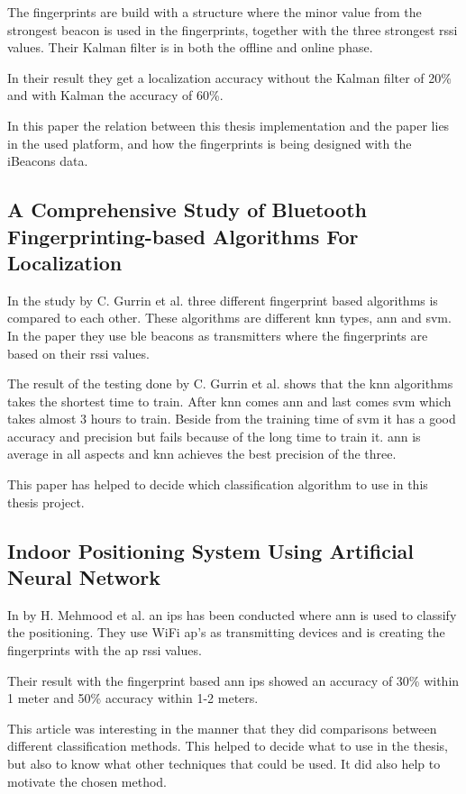 \bigskip

The fingerprints are build with a structure where the minor value from the strongest beacon is used in the fingerprints, together with the three strongest \acrshort{rssi} values.
Their Kalman filter is in both the offline and online phase.

\bigskip

In their result they get a localization accuracy without the Kalman filter of 20\% and with Kalman the accuracy of 60\%.

\bigskip

In this paper the relation between this thesis implementation and the paper lies in the used platform, and how the fingerprints is being designed with the iBeacons data.


\subsection{A Comprehensive Study of Bluetooth Fingerprinting-based Algorithms For 
Localization}\label{sec:}
In the study \cite{ComprehensiveStudyBluetooth2013} by C. Gurrin et al. three different fingerprint based algorithms is compared to each other.
These algorithms are different \acrshort{knn} types, \acrfull{ann} and \acrfull{svm}.
In the paper they use \acrshort{ble} beacons as transmitters where the fingerprints are based on their \acrshort{rssi} values.

\bigskip

The result of the testing done by C. Gurrin et al. shows that the \acrshort{knn} algorithms takes the shortest time to train.
After \acrshort{knn} comes \acrshort{ann} and last comes \acrshort{svm}  which takes almost 3 hours to train.
Beside from the training time of \acrshort{svm}  it has a good accuracy and precision but fails because of the long time to train it.  \acrshort{ann} is average in all aspects and \acrshort{knn} achieves the best precision of the three.

\bigskip

This paper has helped to decide which classification algorithm to use in this thesis project.

\subsection{Indoor Positioning System Using Artificial Neural Network}\label{sec:}
In \cite{IndoorPositioningSystem2010} by H. Mehmood et al. an \acrshort{ips} has been conducted where \acrlong{ann} is used to classify the positioning.
They use WiFi \acrshort{ap}'s as transmitting devices and is creating the fingerprints with the \acrshort{ap} \acrshort{rssi} values.

\bigskip

Their result with the fingerprint based \acrshort{ann} \acrshort{ips} showed an accuracy of 30\% within 1 meter and 50\% accuracy within 1-2 meters.

\bigskip

This article was interesting in the manner that they did comparisons between different classification methods.
This helped to decide what to use in the thesis, but also to know what other techniques that could be used.
It did also help to motivate the chosen method.
